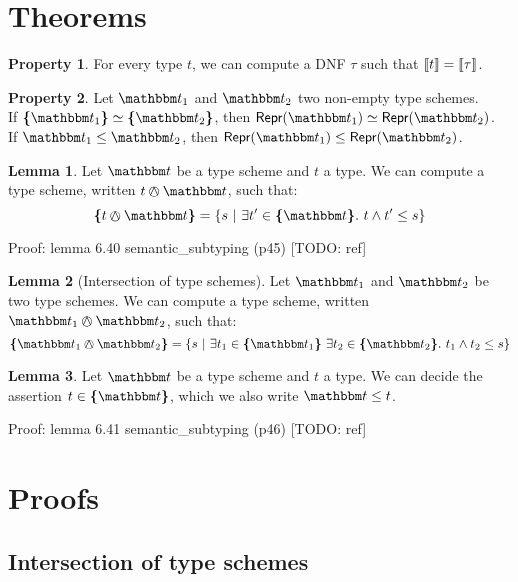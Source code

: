 \documentclass[a4paper]{article}
\theoremstyle{definition}
\newtheorem{lemma}{Lemma}
\newtheorem{property}{Property}
\begin{document}
    \section{Theorems}

    \begin{property}
      For every type $t$, we can compute a DNF $\tau$ such that ${\llbracket t \rrbracket} = {\llbracket \tau \rrbracket}$.
    \end{property}

    \begin{property}
      Let $\ts_1$ and $\ts_2$ two non-empty type schemes.\\
      If $\tsint {\ts_1} \simeq \tsint {\ts_2}$, then $\tsrep {\ts_1} \simeq \tsrep {\ts_2}$.\\
      If $\ts_1 \leq \ts_2$, then $\tsrep {\ts_1} \leq \tsrep {\ts_2}$.
    \end{property}

    \begin{lemma}
      Let $\ts$ be a type scheme and $t$ a type. We can compute a type scheme, written $t \tsand \ts$, such that:
      \[\tsint {t \tsand \ts} = \{s \alt \exists t' \in \tsint \ts.\ t \land t' \leq s \}\]
    \end{lemma}
    Proof: lemma 6.40 semantic\_subtyping (p45) [TODO: ref]

    \begin{lemma}[Intersection of type schemes]
      Let $\ts_1$ and $\ts_2$ be two type schemes. We can compute a type scheme, written $\ts_1 \tsand \ts_2$, such that:
      \[\tsint {\ts_1 \tsand \ts_2} = \{s\alt \exists t_1 \in \tsint {\ts_1}\ 
      \exists t_2 \in \tsint {\ts_2}.\ {t_1} \land {t_2} \leq s\}\]
    \end{lemma}

    \begin{lemma}
      Let $\ts$ be a type scheme and $t$ a type. We can decide the assertion $t \in \tsint \ts$,
      which we also write $\ts \leq t$.
    \end{lemma}
    Proof: lemma 6.41 semantic\_subtyping (p46) [TODO: ref]

    \section{Proofs}

    \subsection{Intersection of type schemes}
\end{document}
